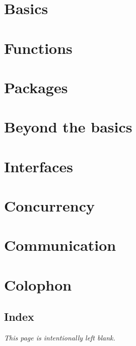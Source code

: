 \documentclass[a4paper,twoside,openleft]{blocksbook}
\begin{document}
\chapter{Basics}
\label{chap:basics}


\chapter{Functions}
\label{chap:functions}


\chapter{Packages}
\label{chap:packages}


\chapter{Beyond the basics}
\label{chap:beyond}


\chapter{Interfaces}
\label{chap:interfaces}


\chapter{Concurrency}
\label{chap:channels}


\chapter{Communication}
\label{chap:communication}



\appendix

\chapter{Colophon}


\begin{twocolumn}
\chapter{Index}
\printindex
\end{twocolumn}
\begin{onecolumn}



\newpage
\thispagestyle{empty}
\begin{center}
\emph{This page is intentionally left blank.}
\end{center}
\end{onecolumn}
\end{document}
